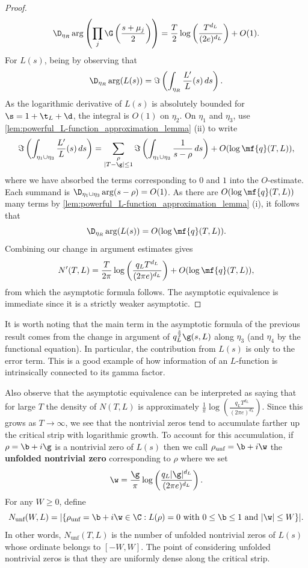 \documentclass[12pt]{article}
\begin{document}
\begin{proof}
        \[
          \D_{\eta_{R}}\arg\left(\prod_{j}\G\left(\frac{s+\mu_{j}}{2}\right)\right) = \frac{T}{2}\log\left(\frac{T^{d_{L}}}{(2e)^{d_{L}}}\right)+O(1).
        \]
        For \(L(s)\), being by observing that
        \[
          \D_{\eta_{R}}\arg(L(s)) = \Im\left(\int_{\eta_{R}}\frac{L'}{L}(s)\,ds\right).
        \]
        As the logarithmic derivative of \(L(s)\) is absolutely bounded for \(\s = 1+\t_{L}+\d\), the integral is \(O(1)\) on \(\eta_{2}\). On \(\eta_{1}\) and \(\eta_{3}\), use \cref{lem:powerful_L-function_approximation_lemma} (ii) to write
        \[
          \Im\left(\int_{\eta_{1} \cup \eta_{3}}\frac{L'}{L}(s)\,ds\right) = \sum_{\substack{\rho \\ |T-\g| \le 1}}\Im\left(\int_{\eta_{1} \cup \eta_{3}}\frac{1}{s-\rho}\,ds\right)+O(\log\mf{q}(T,L)),
        \]
        where we have absorbed the terms corresponding to \(0\) and \(1\) into the \(O\)-estimate. Each summand is \(\D_{\eta_{1} \cup \eta_{3}}\arg(s-\rho) = O(1)\). As there are \(O(\log\mf{q}(T,L))\) many terms by \cref{lem:powerful_L-function_approximation_lemma} (i), it follows that
        \[
          \D_{\eta_{R}}\arg(L(s)) = O(\log{\mf{q}(T,L)}).
        \]
        Combining our change in argument estimates gives
        \[
          N'(T,L) = \frac{T}{2\pi}\log\left(\frac{q_{L}T^{d_{L}}}{(2\pi e)^{d_{L}}}\right)+O(\log{\mf{q}(T,L)}),
        \]
        from which the asymptotic formula follows. The asymptotic equivalence is immediate since it is a strictly weaker asymptotic.
      \end{proof}

      It is worth noting that the main term in the asymptotic formula of the previous result comes from the change in argument of \(q_{L}^{\frac{s}{2}}\g(s,L)\) along \(\eta_{3}\) (and \(\eta_{4}\) by the functional equation). In particular, the contribution from \(L(s)\) is only to the error term. This is a good example of how information of an \(L\)-function is intrinsically connected to its gamma factor.
      
      Also observe that the asymptotic equivalence can be interpreted as saying that for large \(T\) the density of \(N(T,L)\) is approximately \(\frac{1}{\pi}\log\left(\frac{q_{L}T^{d_{L}}}{(2\pi e)^{d_{L}}}\right)\). Since this grows as \(T \to \infty\), we see that the nontrivial zeros tend to accumulate farther up the critical strip with logarithmic growth. To account for this accumulation, if \(\rho = \b+i\g\) is a nontrivial zero of \(L(s)\) then we call \(\rho_{\text{unf}} = \b+i\w\) the \textbf{unfolded nontrivial zero} corresponding to \(\rho\) where we set
      \[
        \w = \frac{\g}{\pi}\log\left(\frac{q_{L}|\g|^{d_{L}}}{(2\pi e)^{d_{L}}}\right).
      \]
      For any \(W \ge 0\), define
      \[
        N_{\text{unf}}(W,L) = |\{\rho_{\text{unf}} = \b+i\w \in \C:L(\rho) = 0 \text{ with } 0 \le \b \le 1 \text{ and } |\w| \le W\}|.
      \]
      In other words, \(N_{\text{unf}}(T,L)\) is the number of unfolded nontrivial zeros of \(L(s)\) whose ordinate belongs to \([-W,W]\). The point of considering unfolded nontrivial zeros is that they are uniformly dense along the critical strip.
\end{document}
